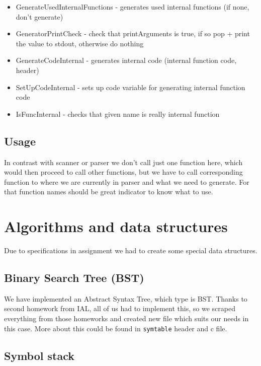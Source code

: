 \documentclass[11pt, titlepage]{article}
\begin{document}
\begin{itemize}[itemsep=-5pt]
\item
  GenerateUsedInternalFunctions - generates used internal functions (if
  none, don't generate)
\item
  GeneratorPrintCheck - check that printArguments is true, if so pop +
  print the value to stdout, otherwise do nothing
\item
  GenerateCodeInternal - generates internal code (internal function
  code, header)
\item
  SetUpCodeInternal - sets up code variable for generating internal
  function code
\item
  IsFuncInternal - checks that given name is really internal function
\end{itemize}

\subsection{Usage}\label{usage-2}

In contrast with scanner or parser we
don't call just one function here, which would then proceed to call
other functions, but we have to call corresponding function to where we
are currently in parser and what we need to generate. For that function
names should be great indicator to know what to use.





\section{Algorithms and data
structures}\label{algorithms-and-data-structures}

Due to specifications in assignment we had to create some special
data structures.

\subsection{Binary Search Tree (BST)}\label{binary-search-tree-bst}

We have implemented an Abstract Syntax Tree, which type is BST. Thanks
to second homework from IAL, all of us had to implement this, so we
scraped everything from those homeworks and created new file which suits
our needs in this case. More about this could be found in
\texttt{symtable} header and c file.

\subsection{Symbol stack}\label{symbol-stack}
\end{document}
